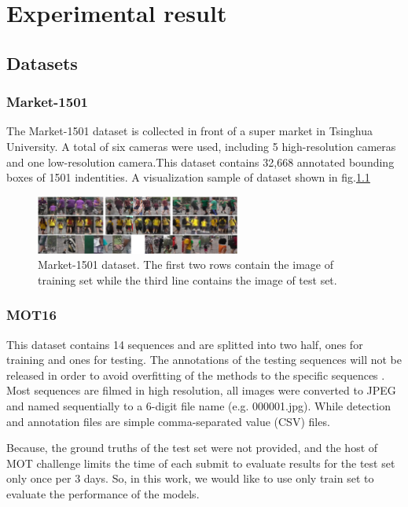 \chapter{Experimental result}
\section{Datasets}
\subsection{Market-1501}
\hspace{0.5cm} The Market-1501 dataset is collected in front of a super market in Tsinghua University. A total of six cameras were used, including 5 high-resolution cameras and one low-resolution camera.This dataset contains 32,668 annotated bounding boxes of 1501 indentities\cite{zheng2015scalable}. A visualization sample of dataset shown in fig.\ref{fig:market1501}
\begin{figure}[h!]
    \centering
    \includegraphics[width=0.6\textwidth]{Chapters/Fig/market-1501.jpg}
    \caption{Market-1501 dataset. The first two rows contain the image of training set while the third line contains the image of test set.}
    \label{fig:market1501}
\end{figure}
\subsection{MOT16}
\hspace{0.5cm} This dataset contains 14 sequences and are splitted into two half, ones for training and ones for testing. The annotations of the testing sequences will not be released in order to avoid overfitting of the methods to the specific sequences \cite{Milan2016MOT16AB}.
Most sequences are filmed in high resolution, all images were converted to JPEG and named sequentially to a 6-digit file name (e.g. 000001.jpg). While detection and annotation files are simple comma-separated value (CSV) files.\par
Because, the ground truths of the test set were not provided, and the host of MOT challenge limits the time of each submit to evaluate results for the test set only once per 3 days. So, in this work, we would like to use only train set to evaluate the performance of the models.
